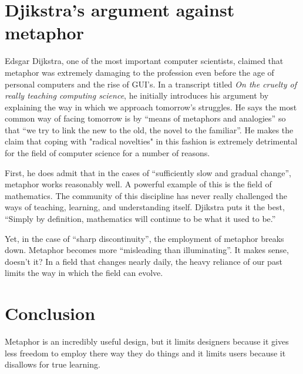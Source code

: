 \documentclass[11pt, oneside]{article}   	%
\begin{document}
\section{Djikstra's argument against metaphor}
Edsgar Dijkstra, one of the most important computer scientists, claimed that metaphor was extremely damaging to the profession even before the age of personal computers and the rise of GUI's. In a transcript titled \textit{On the cruelty of really teaching computing science}, he initially introduces his argument by explaining the way in which we approach tomorrow's struggles. He says the most common way of facing tomorrow is by ``means of metaphors and analogies'' so that ``we try to link the new to the old, the novel to the familiar''. He makes the claim that coping with "radical novelties" in this fashion is extremely detrimental for the field of computer science for a number of reasons.

First, he does admit that in the cases of ``sufficiently slow and gradual change'', metaphor works reasonably well. A powerful example of this is the field of mathematics. The community of this discipline has never really challenged the ways of teaching, learning, and understanding itself. Djikstra puts it the best, ``Simply by definition, mathematics will continue to be what it used to be.''

Yet, in the case of ``sharp discontinuity'', the employment of metaphor breaks down. Metaphor becomes more ``misleading than illuminating''. It makes sense, doesn't it? In a field that changes nearly daily, the heavy reliance of our past limits the way in which the field can evolve.
\cite{ewd1036}

\section{Conclusion}
Metaphor is an incredibly useful design, but it limits designers because it gives less freedom to employ there way they do things and it limits users because it disallows for true learning.

\pagebreak


\end{document}
